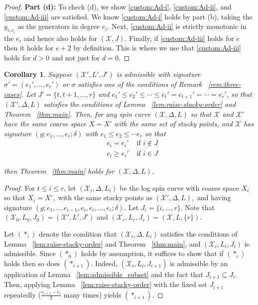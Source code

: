 \documentclass{amsart}
\theoremstyle{plain}
\newtheorem{cor}[thm]{Corollary}
\theoremstyle{definition}
\theoremstyle{remark}
\numberwithin{equation}{section}
\newcommand\sx{\mathscr X}
\newcommand{\halfcan}{L}
\begin{document}
\begin{proof}
{\bf Part (d):}
To check (d), we show \ref{custom:Ad-i}, \ref{custom:Ad-ii}, and \ref{custom:Ad-iii} are satisfied. We know \ref{custom:Ad-i} holds by part (b), taking the $y_{
i, e_i}$ as the generators in degree $e_i$. Next, \ref{custom:Ad-ii} is
strictly monotonic in the $e_i$ and hence also holds for $(\sx, J)$.
Finally, if \ref{custom:Ad-iii} holds for $e$ then it holds for $e + 2$ by
definition. This is where we use that \ref{custom:Ad-iii} holds for $d > 0$
and not just for $d = 0$.
\end{proof}

\begin{cor}
\label{cor:raise-stacky-order}
Suppose $(\sx', \halfcan',J')$ is admissible with signature $\sigma' = (e_1
', \ldots,e_r')$ or $\sigma$ satisfies one of the conditions of
Remark ~\ref{rem:three-cases}. Let $J' = \{t,t+1, \ldots,r\}$ and
$e_1' \leq e_2' \leq \cdots \leq e_t' = e_{t+1}' =\cdots = e_r'$,
so that $(\sx', \Delta, L)$ satisfies the conditions of Lemma
~\ref{lem:raise-stacky-order} and Theorem ~\ref{thm:main}. Then,
for any spin curve $(\sx, \Delta, L)$ so that $\sx$ and $\sx'$ have
the same coarse space $X = X'$ with the same set of stacky points,
and $  \sx$ has signature $(g; e_1, \ldots, e_r; \delta)$ with $e_1
\leq e_2 \leq \cdots e_r$ so that
\begin{align*}
	& e_i	= e_i' &\text{ if }i \notin J \\
	& e_i \ge e_i' &\text{ if } i \in J
\end{align*}

\noindent
then Theorem ~\ref{thm:main} holds for $(\sx, \Delta, \halfcan)$.
\end{cor}

\begin{proof}
For $t \leq i \leq r$, let $(\sx_i, \Delta, \halfcan_i)$ be the log spin curve with coarse space $X_i$ so that $X_i = X',$ with the same stacky points as $(\sx', \Delta, \halfcan),$ and having signature $(g; e_1, \ldots. e_{i - 1}, e_i, e_i, \ldots, e_i; \delta).$ Let 
$J_i = \{i, \ldots, r\}.$ Note that $(\sx_0, \halfcan_0,J_0) = (\sx', \halfcan',J')$ and $(\sx_r , \halfcan_r ,J_r) = (\sx, L, \{r\})$.

Let $(*_i)$ denote the condition that $(\sx_i, \Delta, L_i)$
satisfies the conditions of Lemma ~\ref{lem:raise-stacky-order} and
Theorem ~\ref{thm:main}, and $(\sx_i, \halfcan_i, J_i)$ is
admissible. Since $(*_0)$ holds by assumption, it suffices to show
that if $(*_i)$ holds then so does $(*_{i + 1})$. Indeed, $(\sx_i,
\halfcan_i, J_{i + 1})$ is admissible by an application of Lemma
~\ref{lem:admissible_subset} and the fact that $J_{i + 1} \subseteq J
_i$. Then, applying Lemma ~\ref{lem:raise-stacky-order} with the
fixed set $J_{i + 1}$ repeatedly ($\frac{e_{i + 1} - e_i}{2}$ many
times) yields $(*_{i + 1})$.
\end{proof}
\end{document}
